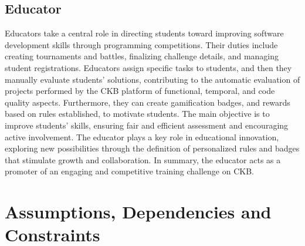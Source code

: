 \subsection*{Educator}
Educators take a central role in directing students toward improving software development skills through programming competitions. 
Their duties include creating tournaments and battles, finalizing challenge details, and managing student registrations. 
Educators assign specific tasks to students, and then they manually evaluate students' solutions, contributing to the automatic evaluation of projects performed by the CKB platform of functional, temporal, and code quality aspects. 
Furthermore, they can create gamification badges, and rewards based on rules established, to motivate students. 
The main objective is to improve students' skills, ensuring fair and efficient assessment and encouraging active involvement. 
The educator plays a key role in educational innovation, exploring new possibilities through the definition of personalized rules and badges that stimulate growth and collaboration. 
In summary, the educator acts as a promoter of an engaging and competitive training challenge on CKB.

\section{Assumptions, Dependencies and Constraints}

